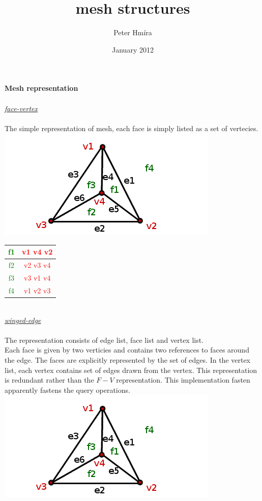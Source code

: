 \documentclass{article}
\title{mesh structures}
\author{Peter Hmíra}
\date{January 2012}
\begin{document}
\textbf{Mesh representation}\\
\\
\underline{\emph{face-vertex}}\\
\\
The simple representation of mesh, each face is simply listed as a set of vertecies.\\
\includegraphics[scale=0.4]{mesh-r.png}
\\
\begin{table}[!h]
\begin{tabular}{|c||c|}
\hline
\textcolor{green}{f1} & \textcolor{red}{v1 v4 v2} \\ \hline
\textcolor{green}{f2} & \textcolor{red}{v2 v3 v4} \\ \hline
\textcolor{green}{f3} & \textcolor{red}{v3 v1 v4} \\ \hline
\textcolor{green}{f4} & \textcolor{red}{v1 v2 v3} \\ \hline
\end{tabular}
\end{table}
\\
\underline{\emph{winged-edge}}\\
\\
The representation consists of edge list, face list and vertex list.\\
Each face is given by two verticies and contains two references to faces around the edge.
The faces are explicitly represented by the set of edges. In the vertex list, each vertex contains
set of edges drawn from the vertex. This representation is redundant rather than the $F-V$ representation.
 This implementation fasten apparently fastens the query operations.\\
 
\includegraphics[scale=0.4]{mesh-r.png}
\\
\end{document}
